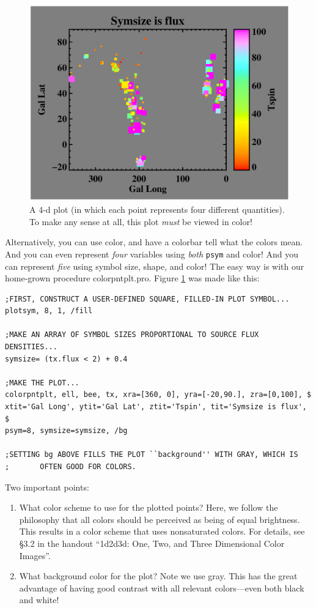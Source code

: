 \documentclass[psfig,preprint]{aastex}
\begin{document}
\begin{figure}[!ht]
\begin{center}
\includegraphics[scale=0.8]{colorpntplt.ps}
\caption{A 4-d plot (in which each point represents four different
  quantities). To make any sense at all, this plot {\it must} be viewed
  in color! \label{colorpntplt}}
\end{center}
\end{figure}

Alternatively, you can use color, and have a colorbar tell what the colors
mean. And you can even represent {\it four} variables using {\it both}
{\tt psym} and color! And you can represent {\it five} using symbol
size, shape, and color! The easy way is with our home-grown procedure
{colorpntplt.pro}. Figure \ref{colorpntplt} was made like this:

\begin{verbatim}
;FIRST, CONSTRUCT A USER-DEFINED SQUARE, FILLED-IN PLOT SYMBOL...
plotsym, 8, 1, /fill

;MAKE AN ARRAY OF SYMBOL SIZES PROPORTIONAL TO SOURCE FLUX DENSITIES...
symsize= (tx.flux < 2) + 0.4

;MAKE THE PLOT...
colorpntplt, ell, bee, tx, xra=[360, 0], yra=[-20,90.], zra=[0,100], $
xtit='Gal Long', ytit='Gal Lat', ztit='Tspin', tit='Symsize is flux', $
psym=8, symsize=symsize, /bg

;SETTING bg ABOVE FILLS THE PLOT ``background'' WITH GRAY, WHICH IS
;       OFTEN GOOD FOR COLORS.
\end{verbatim}

\noindent Two important points: \begin{enumerate}
\item What color scheme to use for the plotted points? Here, we follow
  the philosophy that all colors should be perceived as being of equal
  brightness. This results in a color scheme that uses nonsaturated
  colors. For details, see \S 3.2 in the handout ``1d2d3d: One, Two, and
  Three Dimensional Color Images''.

\item What background color for the plot? Note we use gray. This has the
  great advantage of having good contrast with all relevant
  colors---even both black and white!
\end{enumerate}
\end{document}
